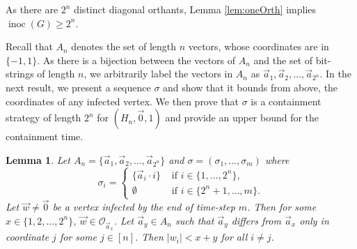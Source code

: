 \documentclass[unknownkeysallowed]{article}
\newtheorem{lemma}[theorem]{Lemma}
\theoremstyle{definition}\newtheorem{strategy}{Strategy}
\theoremstyle{definition}\newtheorem{notation}{Notation}[theorem]
\DeclareMathOperator{\inoc}{inoc}
\begin{document}
As there are $2^n$ distinct diagonal orthants, Lemma \ref{lem:oneOrth} implies $\inoc(G) \geq 2^n$.\medskip


Recall that $A_n$ denotes the set of length $n$ vectors, whose coordinates are in $\{-1,1\}$.  As there is a bijection between the vectors of $A_n$ and the set of bit-strings of length $n$, we arbitrarily label the vectors in $A_n$ as $\vec{a}_1,\vec{a}_2,\dots,\vec{a}_{2^n}$. In the next result, we present a sequence $\sigma$ and show that it bounds from above, the coordinates of any infected vertex.  We then prove that $\sigma$ is a containment strategy of length $2^n$ for $(H_n,\vec{0},1)$ and provide an upper bound for the containment time. 

\begin{lemma}\label{lem: strong containment} Let $A_n = \{\vec{a}_1,\vec{a}_2,\dots,\vec{a}_{2^n}\}$ and $\sigma = (\sigma_1,\dots,\sigma_m)$ where $$\sigma_i = \begin{cases} \{\vec{a}_i \cdot i\} & \text{~if~} i \in \{1,\dots,2^n\}, \\  \emptyset & \text{~if~} i \in \{2^n+1,\dots,m\}.\end{cases}$$  Let  
$\vec{w} \neq \vec{0}$
be a vertex infected by the end of time-step $m$.  Then for some $x \in \{1,2,\dots,2^n\}$, 
$\vec{w} \in \mathcal{O}_{\vec{a}_x}$.  Let $\vec{a}_y \in A_n$ such that $\vec{a}_y$ differs from $\vec{a}_x$ only in coordinate $j$ for some $j \in [n]$.  Then $|w_i| < x+y$ for all $i \neq j$.
\end{lemma}
\end{document}

